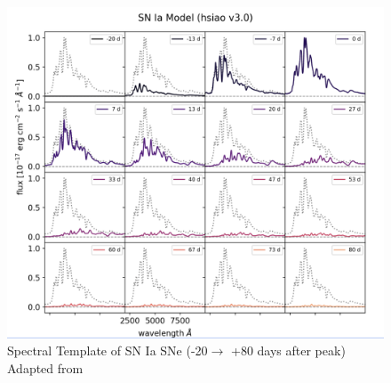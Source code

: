 \begin{frame}
    \begin{figure}[t]
        \includegraphics[width=.6\textwidth]{figures/desi_figures/snia_templates.png}
        \caption{Spectral Template of SN Ia SNe (-20$\to$ +80 days after peak) Adapted from \textcite{DESIpresentation}}
        \label{fig:sne_template}
    \end{figure}
\end{frame}











